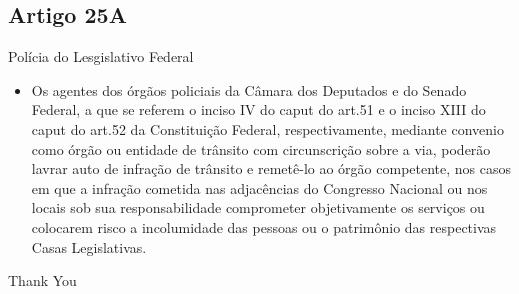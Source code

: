 \documentclass{beamer}
\begin{document}
\subsection{Artigo 25A}
\begin{frame}{Polícia do Lesgislativo Federal}
    \begin{itemize}
        \item \justifying Os agentes dos órgãos policiais da Câmara dos Deputados e do Senado Federal, a que se referem o inciso IV do caput do art.51 e o inciso XIII do caput do art.52 da Constituição Federal, respectivamente, mediante convenio como órgão ou entidade de trânsito com circunscrição sobre a via, poderão lavrar auto de infração de trânsito e remetê-lo ao órgão competente, nos casos em que a infração cometida nas adjacências do Congresso Nacional ou nos locais sob sua responsabilidade comprometer objetivamente os serviços ou colocarem risco a incolumidade das pessoas ou o patrimônio das respectivas Casas Legislativas.
    \end{itemize}
\end{frame}













\begin{frame}
    \begin{center}
        {\Huge\calligra Thank You}
    \end{center}
\end{frame}
\end{document}
